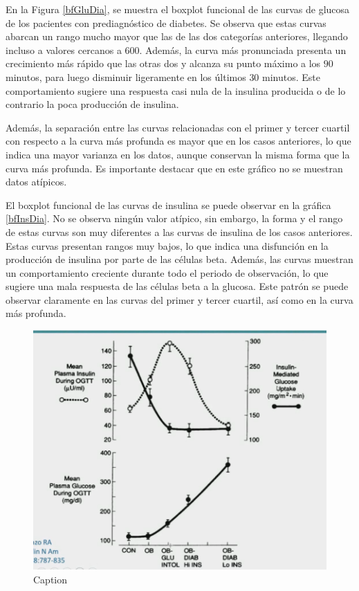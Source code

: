 En la Figura \ref{bfGluDia}, se muestra el boxplot funcional de las curvas de glucosa de los pacientes con prediagnóstico de diabetes. Se observa que estas curvas abarcan un rango mucho mayor que las de las dos categorías anteriores, llegando incluso a valores cercanos a $600$. Además, la curva más pronunciada presenta un crecimiento más rápido que las otras dos y alcanza su punto máximo a los $90$ minutos, para luego disminuir ligeramente en los últimos $30$ minutos. Este comportamiento sugiere una respuesta casi nula de la insulina producida o de lo contrario la poca producción de insulina. 

Además, la separación entre las curvas relacionadas con el primer y tercer cuartil con respecto a la curva más profunda es mayor que en los casos anteriores, lo que indica una mayor varianza en los datos, aunque conservan la misma forma que la curva más profunda. Es importante destacar que en este gráfico no se muestran datos atípicos.

El boxplot funcional de las curvas de insulina se puede observar en la gráfica \ref{bfInsDia}. No se observa ningún valor atípico, sin embargo, la forma y el rango de estas curvas son muy diferentes a las curvas de insulina de los casos anteriores. Estas curvas presentan rangos muy bajos, lo que indica una disfunción en la producción de insulina por parte de las células beta. Además, las curvas muestran un comportamiento creciente durante todo el periodo de observación, lo que sugiere una mala respuesta de las células beta a la glucosa.  Este patrón se puede observar claramente en las curvas del primer y tercer cuartil, así como en la curva más profunda.

\begin{figure}[H]
    \centering
    \includegraphics[width = 0.8 \textwidth]{Imagenes/InsulinaGlucosa.png}
    \caption{Caption}
    \label{fig:relGluIns}
\end{figure}

